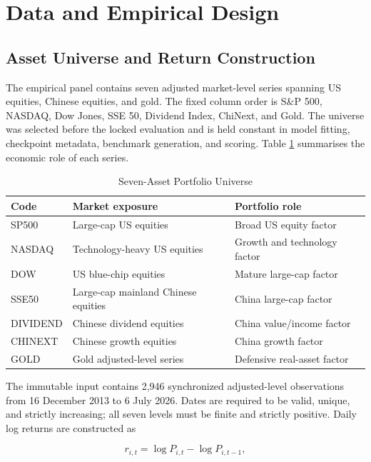 \section{Data and Empirical Design}
\label{sec:data}

\subsection{Asset Universe and Return Construction}
\label{subsec:4_asset_selection}

The empirical panel contains seven adjusted market-level series spanning US equities, Chinese equities, and gold. The fixed column order is S\&P 500, NASDAQ, Dow Jones, SSE 50, Dividend Index, ChiNext, and Gold. The universe was selected before the locked evaluation and is held constant in model fitting, checkpoint metadata, benchmark generation, and scoring. Table \ref{tab:assets} summarises the economic role of each series.

\begin{table}[H]
\centering
\caption{Seven-Asset Portfolio Universe}
\label{tab:assets}
\begin{tabular}{l l l}
\toprule
\textbf{Code} & \textbf{Market exposure} & \textbf{Portfolio role} \\
\midrule
SP500 & Large-cap US equities & Broad US equity factor \\
NASDAQ & Technology-heavy US equities & Growth and technology factor \\
DOW & US blue-chip equities & Mature large-cap factor \\
SSE50 & Large-cap mainland Chinese equities & China large-cap factor \\
DIVIDEND & Chinese dividend equities & China value/income factor \\
CHINEXT & Chinese growth equities & China growth factor \\
GOLD & Gold adjusted-level series & Defensive real-asset factor \\
\bottomrule
\end{tabular}
\end{table}

The immutable input contains 2,946 synchronized adjusted-level observations from 16 December 2013 to 6 July 2026. Dates are required to be valid, unique, and strictly increasing; all seven levels must be finite and strictly positive. Daily log returns are constructed as

\begin{equation}
r_{i,t}=\log P_{i,t}-\log P_{i,t-1},
\label{eq:data_log_returns}
\end{equation}

